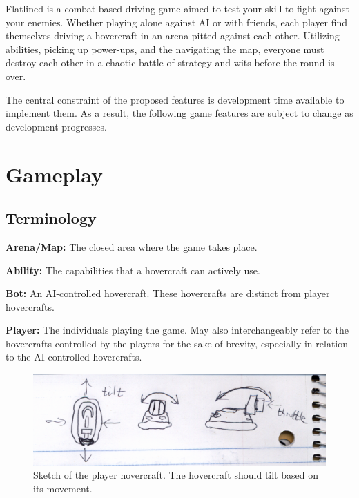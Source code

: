 \documentclass{article}
\newcommand{\name}{Flatlined}
\theoremstyle{definition}
\begin{document}
\name{} is a combat-based driving game aimed to test your skill to fight
against your enemies. Whether playing alone against AI or with friends, each
player find themselves driving a hovercraft in an arena pitted against each
other. Utilizing abilities, picking up power-ups, and the navigating the map,
everyone must destroy each other in a chaotic battle of strategy and wits
before the round is over.

The central constraint of the proposed features is development time available
to implement them. As a result, the following game features are subject to
change as development progresses.

\section{Gameplay}

\subsection{Terminology}


\textbf{Arena/Map:} The closed area where the game takes place.

\textbf{Ability:} The capabilities that a hovercraft can actively use.

\textbf{Bot:} An AI-controlled hovercraft. These hovercrafts are distinct from
player hovercrafts.


\textbf{Player:} The individuals playing the game. May also interchangeably
refer to the hovercrafts controlled by the players for the sake of brevity,
especially in relation to the AI-controlled hovercrafts.

\begin{figure}[htpb]
  \centering
  \includegraphics[width=0.8\linewidth]{Brainstorming_003.png}
  \caption{Sketch of the player hovercraft. The hovercraft should tilt based on
  its movement.}
\label{fig:Brainstorming_003}
\end{figure}
\end{document}
